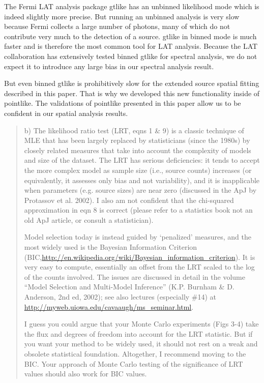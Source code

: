 \documentclass{article}
\newenvironment{referee}
{\begin{quote}\color{red}}
  {\end{quote}}
\newenvironment{reply}
  {}
  {}
\begin{document}
\begin{reply}
The Fermi LAT analysis package gtlike has an unbinned likelihood mode
which is indeed slightly more precise. But running an unbinned analysis
is very slow because Fermi collects a large number of photons, many of
which do not contribute very much to the detection of a source. gtlike
in binned mode is much faster and is therefore the most common tool
for LAT analysis. Because the LAT collaboration has extensively tested
binned gtlike for spectral analysis, we do not expect it to introduce
any large bias in our spectral analysis result.

But even binned gtlike is prohibitively slow for the extended source
spatial fitting described in this paper. That is why we developed this
new functionality inside of pointlike. The validations of pointlike
presented in this paper allow us to be confident in our spatial analysis results.
\end{reply}


\begin{referee}
b) The likelihood ratio test (LRT, eqns 1 \& 9) is a classic technique of
MLE that has been largely replaced by statisticians (since the 1980s) by
closely related measures that take into account the complexity of models
and size of the dataset. The LRT has serious deficiencies: it tends
to accept the more complex model as sample size (i.e., source counts)
increases (or equivalently, it assesses only bias and not variability),
and it is inapplicable when parameters (e.g. source sizes) are near zero
(discussed in the ApJ by Protassov et al. 2002). I also am not confident
that the chi-squared approximation in eqn 8 is correct (please refer to
a statistics book not an old ApJ article, or consult a statistician).

Model selection today is instead guided by `penalized' measures,
and the most widely used is the Bayesian Information Criterion
(BIC,\url{http://en.wikipedia.org/wiki/Bayesian_information_criterion}). It
is very easy to compute, essentially an offset from the LRT scaled to
the log of the counts involved. The issues are discussed in detail in
the volume ``Model Selection and Multi-Model Inference'' (K.P. Burnham
\& D. Anderson, 2nd ed, 2002); see also lectures (especially \#14) at
\url{http://myweb.uiowa.edu/cavaaugh/ms_seminar.html}.


I guess you could argue that your Monte Carlo experiments (Figs 3-4) take
the flux and degrees of freedom into account for the LRT statistic. But
if you want your method to be widely used, it should not rest on a weak
and obsolete statistical foundation. Altogether, I recommend moving to
the BIC. Your approach of Monte Carlo testing of the significance of
LRT values should also work for BIC values.
\end{referee}
\end{document}

